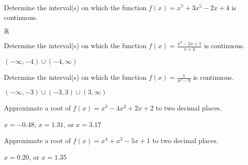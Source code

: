 \begin{exercises}
\begin{exercise} 
Determine the interval(s) on which the function $f(x) = x^7+3x^5-2x +
4$ is continuous.
\begin{answer}
  $\mathbb{R}$
\end{answer}
\end{exercise}



\begin{exercise}
Determine the interval(s) on which the function $f(x) = \frac{x^2-2x+1}{x+4}$ is continuous. 
\begin{answer}
  $(-\infty,-4)\cup(-4,\infty)$
\end{answer}
\end{exercise}



\begin{exercise}
Determine the interval(s) on which the function $f(x) = \frac{1}{x^2
  -9}$ is continuous.
\begin{answer}
  $(-\infty,-3)\cup(-3,3)\cup(3,\infty)$
\end{answer}
\end{exercise}


\begin{exercise}
Approximate a root of $f(x)=x^3-4x^2+2x+2$ to two decimal places.
\begin{answer}
$x=-0.48$, $x=1.31$, or $x=3.17$
\end{answer}
\end{exercise}

\begin{exercise}
Approximate a root of $f(x)=x^4+x^3-5x+1$ to two decimal places.
\begin{answer}
$x=0.20$, or $x=1.35$
\end{answer}
\end{exercise}
\end{exercises}
